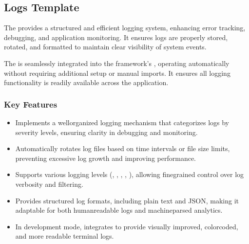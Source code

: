 \documentclass[letterpaper,10pt,english]{sphinxhowto}
\begin{document}
\sphinxstepscope


\subsection{Logs Template}
\label{\detokenize{templates/logs/index:logs-template}}\label{\detokenize{templates/logs/index::doc}}
\sphinxAtStartPar
The  provides a structured and efficient logging system, enhancing error tracking, debugging, and application monitoring. It ensures logs are properly stored, rotated, and formatted to maintain clear visibility of system events.

\sphinxAtStartPar
The  is seamlessly integrated into the framework’s , operating automatically without requiring additional setup or manual imports. It ensures all logging functionality is readily available across the application.


\subsubsection{Key Features}
\label{\detokenize{templates/logs/index:key-features}}\begin{itemize}
\item {} 
\sphinxAtStartPar
{}
Implements a well\sphinxhyphen{}organized logging mechanism that categorizes logs by severity levels, ensuring clarity in debugging and monitoring.

\item {} 
\sphinxAtStartPar
{}
Automatically rotates log files based on time intervals or file size limits, preventing excessive log growth and improving performance.

\item {} 
\sphinxAtStartPar
{}
Supports various logging levels (, , , , ), allowing fine\sphinxhyphen{}grained control over log verbosity and filtering.

\item {} 
\sphinxAtStartPar
{}
Provides structured log formats, including plain text and JSON, making it adaptable for both human\sphinxhyphen{}readable logs and machine\sphinxhyphen{}parsed analytics.

\item {} 
\sphinxAtStartPar
{}
In development mode, integrates  to provide visually improved, color\sphinxhyphen{}coded, and more readable terminal logs.

\end{itemize}
\end{document}
